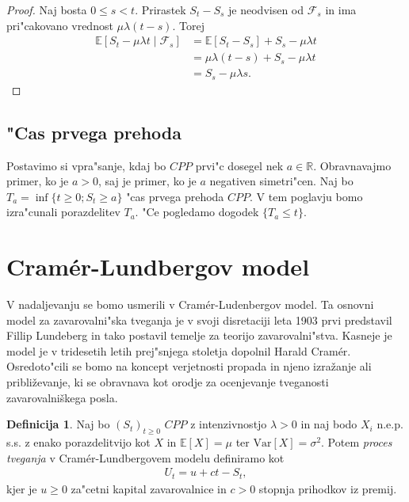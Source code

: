\documentclass[12pt, a4paper, reqno]{amsart}
\theoremstyle{definition} %
\newtheorem{definicija}{Definicija}[section]
\theoremstyle{plain} %
\newcommand{\R}{\mathbb{R}}
\newcommand{\E}{\mathbb{E}}
\newcommand{\F}{\mathcal{F}}
\newcommand{\1}{\mathds{1}}
\newcommand{\Var}[1]{\text{Var}\left[#1\right]}
\begin{document}
        \begin{proof}
            Naj bosta $0 \leq s < t$. Prirastek $S_t - S_s$ je neodvisen od $\F_s$ in ima 
            pri"cakovano vrednost $\mu\lambda(t-s)$. Torej 
            \begin{align*}
                \E\left[S_t - \mu\lambda t\mid\F_s\right] 
                        &= \E\left[S_t - S_s\right] + S_s - \mu\lambda t\\
                        &= \mu\lambda(t-s) + S_s - \mu\lambda t\\
                        &= S_s - \mu\lambda s.
            \end{align*}
        \end{proof}

        \subsection{"Cas prvega prehoda}
        Postavimo si vpra"sanje, kdaj bo $CPP$ prvi"c dosegel nek $a\in\R$. Obravnavajmo primer, ko je 
        $a>0$, saj je primer, ko je $a$ negativen simetri"cen. Naj bo $T_a = \inf\{t\geq0; S_t \geq a\}$ 
        "cas prvega prehoda $CPP$. V tem poglavju bomo izra"cunali porazdelitev $T_a$.
        "Ce pogledamo dogodek $\{T_a \leq t\}$.

\section{Cramér-Lundbergov model}
    V nadaljevanju se bomo usmerili v Cramér-Ludenbergov model. Ta osnovni model za zavarovalni"ska
    tveganja je v svoji disretaciji leta 1903 prvi predstavil Fillip Lundeberg in tako postavil temelje
    za teorijo zavarovalni"stva. Kasneje je model je v tridesetih letih prej"snjega stoletja dopolnil 
    Harald Cramér. Osredoto"cili se bomo na koncept verjetnosti propada in njeno izražanje ali približevanje,
    ki se obravnava kot orodje za ocenjevanje tveganosti zavarovalniškega posla.

    \begin{definicija}
        Naj bo $(S_t)_{t\geq0}$ $CPP$ z intenzivnostjo $\lambda > 0$ in naj bodo $X_i$ n.e.p. s.s.
        z enako porazdelitvijo kot $X$ in $\E\left[X\right] = \mu$ ter $\Var{X} = \sigma^2$. Potem 
        \textit{proces tveganja} v Cramér-Lundbergovem modelu definiramo kot
        \begin{align*}
            U_t = u + ct - S_t,
        \end{align*}
        kjer je $u \geq 0$ za"cetni kapital zavarovalnice in $c>0$ stopnja prihodkov iz premij. 
        \label{def:procesTveganja}
    \end{definicija}
\end{document}
